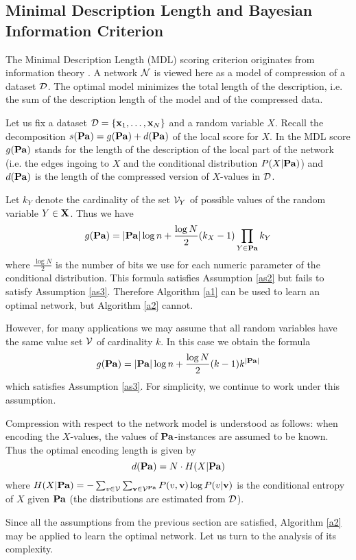 \subsection{Minimal Description Length and Bayesian Information Criterion}

 The Minimal Description Length (MDL) scoring criterion originates from information theory \cite{lam94}. 
 A network $\mathcal{N}$ is viewed here as a model of compression of a dataset $\mathcal{D}$. 
 The optimal model minimizes the total length of the description, i.e. the sum of the description length of the model and of the compressed data.

 Let us fix a dataset $\mathcal{D}=\{\mathbf{x}_1,\ldots,\mathbf{x}_N\}$ and a random variable $X$. 
 Recall the decomposition $s(\mathbf{Pa})=g(\mathbf{Pa})+d(\mathbf{Pa})$ of the local score for $X$. 
 In the MDL score $g(\mathbf{Pa})$ stands for the length of the description of the local part of the network (i.e. the edges ingoing to $X$ and the conditional distribution $P(X|\mathbf{Pa})$) and $d(\mathbf{Pa})$ is the length of the compressed version of $X$-values in $\mathcal{D}$.
 
 Let $k_Y$ denote the cardinality of the set $\mathcal{V}_Y$ of possible values of the random variable $Y\in\mathbf{X}$.
 Thus we have 
 $$g(\mathbf{Pa})=|\mathbf{Pa}|\log n+\frac{\log N}{2}(k_X-1)\prod_{Y\in\mathbf{Pa}}k_Y$$
 where $\frac{\log N}{2}$ is the number of bits we use for each numeric parameter of the conditional distribution. 
 This formula satisfies Assumption \ref{as2} but fails to satisfy Assumption \ref{as3}.
 Therefore Algorithm \ref{a1} can be used to learn an optimal network, but Algorithm \ref{a2} cannot. 
 
 However, for many applications we may assume that 
 all random variables have the same value set $\mathcal{V}$ of cardinality $k$.
 In this case we obtain the formula
 $$g(\mathbf{Pa})=|\mathbf{Pa}|\log n+\frac{\log N}{2}(k-1)k^{|\mathbf{Pa}|}$$
 which satisfies Assumption \ref{as3}.
 For simplicity, we continue to work under this assumption.
 
 Compression with respect to the network model is understood as follows: when encoding the $X$-values, the values of $\mathbf{Pa}$-instances are assumed to be known. 
 Thus the optimal encoding length is given by 
 $$d(\mathbf{Pa})=N\cdot H(X|\mathbf{Pa})$$
 where $H(X|\mathbf{Pa})=-\sum_{v\in\mathcal{V}}\sum_{\mathbf{v}\in\mathcal{V}^{\mathbf{Pa}}}P(v,\mathbf{v})\log P(v|\mathbf{v})$ is the conditional entropy of $X$ given $\mathbf{Pa}$ (the distributions are estimated from $\mathcal{D}$).
 
 Since all the assumptions from the previous section are satisfied, Algorithm \ref{a2} may be applied to learn the optimal network. 
 Let us turn to the analysis of its complexity.
 
